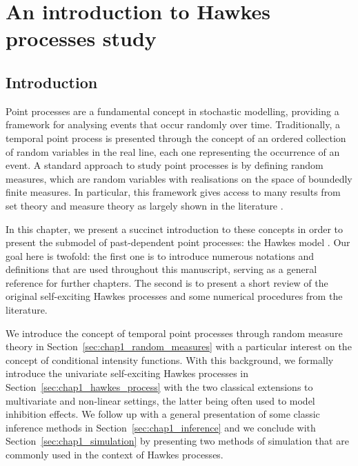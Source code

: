 \leadchapter{
  
}

\chapter[][]{An introduction to Hawkes processes study}\label{chapter:background}

\section{Introduction}

Point processes are a fundamental concept in stochastic modelling, providing a framework for analysing events that occur randomly over time. 
Traditionally, a temporal point process is presented through the concept of an ordered collection of random variables in the real line, each one representing the occurrence of an event.
A standard approach to study point processes is by defining random measures, which are random variables with realisations on the space of boundedly finite measures.
In particular, this framework gives access to many results from set theory and measure theory as largely shown in the literature \parencite{Cox1980, Baddeley2006, DaleyV2, Baccelli2020}.

In this chapter, we present a succinct introduction to these concepts in order to present the submodel of past-dependent point processes: the Hawkes model \parencite{Hawkes1971}.
Our goal here is twofold: the first one is to introduce numerous notations and definitions that are used throughout this manuscript, serving as a general reference for further chapters. The second is to present a short review of the original self-exciting Hawkes processes and some numerical procedures from the literature.

We introduce the concept of temporal point processes through random measure theory in Section~\ref{sec:chap1_random_measures} with a particular interest on the concept of conditional intensity functions. 
With this background, we formally introduce the univariate self-exciting Hawkes processes in Section~\ref{sec:chap1_hawkes_process} with the two classical extensions to multivariate and  non-linear settings, the latter being often used to model inhibition effects.
We follow up with a general presentation of some classic inference methods in Section~\ref{sec:chap1_inference} and we conclude with Section~\ref{sec:chap1_simulation} by presenting two methods of simulation that are commonly used in the context of Hawkes processes.



